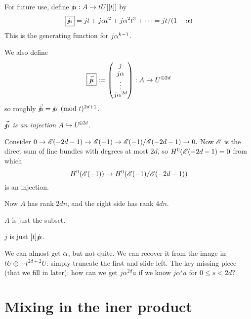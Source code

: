 {For future use, define $\mathord{j\mkern-7mu\alpha}: A \rightarrow t U[[t]]$ by
$$\boxed{\mathord{j\mkern-7mu\alpha}} = j t + j \alpha  t^2 + j \alpha^2  t^3 + \cdots = jt/(1-\alpha)$$
This is the generating function for $j \alpha^{k-1}$.

We also define
$$
\boxed{\vec{\mathord{j\mkern-7mu\alpha}}} :=
\begin{pmatrix}
j \\
  j \alpha \\
  \vdots \\
j \alpha^{2d}
\end{pmatrix} : A \rightarrow U^{\oplus 2d}
$$
so roughly $\vec{\mathord{j\mkern-7mu\alpha}} = 
\mathord{j\mkern-7mu\alpha} \pmod t^{2d+1}$.

   {\em $\vec{\mathord{j\mkern-7mu\alpha}}$ is an injection $A \hookrightarrow U^{\oplus 2d}$.
}


Consider $0 \rightarrow {\mathscr{E}}(-2d-1) \rightarrow {\mathscr{E}}(-1) \rightarrow {\mathscr{E}}(-1)/{\mathscr{E}}(-2d-1) \rightarrow 0.$
Now ${\mathscr{E}}$ is the direct sum of line bundles with degrees at most $2d$,
so $H^0({\mathscr{E}}(-2d-1)=0$ from which
$$
H^0({\mathscr{E}}(-1)) \rightarrow H^0({\mathscr{E}}(-1)/ {\mathscr{E}}(-2d-1))$$ is an  injection. \epf

Now $A$ has rank $2dn$, and  the right side has rank $4dn$.


$A$ is just the subset.

$j$ is just $[t] \mathord{j\mkern-7mu\alpha}$.

We can almost get $\alpha$, but not quite. We can recover it from the image in
$tU \oplus \cdots t^{2d+2}U$:  simply truncate the first and slide left.
The key missing piece (that we fill in later):  how can we get $j \alpha^{2d} a$ if we know $j \alpha^s a$ for $0 \leq s < 2d$?


\section{Mixing in the iner product}


}
